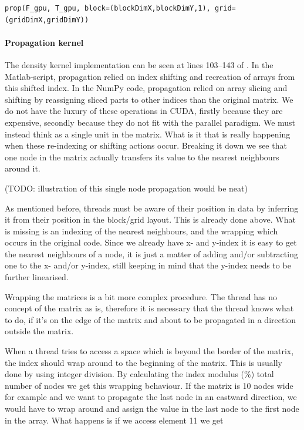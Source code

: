 \begin{verbatim}
prop(F_gpu, T_gpu, block=(blockDimX,blockDimY,1), grid=(gridDimX,gridDimY))
\end{verbatim}


\paragraph{Propagation kernel} The density kernel implementation can be seen at lines 103--143 of . In the Matlab-script, propagation relied on index shifting and recreation of arrays from this shifted index. In the NumPy code, propagation relied on array slicing and shifting by reassigning sliced parts to other indices than the original matrix. We do not have the luxury of these operations in CUDA, firstly because they are expensive, secondly because they do not fit with the parallel paradigm. We must instead think as a single unit in the matrix. What is it that is really happening when these re-indexing or shifting actions occur. Breaking it down we see that one node in the matrix actually transfers its value to the nearest neighbours around it.

(TODO: illustration of this single node propagation would be neat)

As mentioned before, threads must be aware of their position in data by inferring it from their position in the block/grid layout. This is already done above. What is missing is an indexing of the nearest neighbours, and the wrapping which occurs in the original code. Since we already have x- and y-index it is easy to get the nearest neighbours of a node, it is just a matter of adding and/or subtracting one to the x- and/or y-index, still keeping in mind that the y-index needs to be further linearised.

Wrapping the matrices is a bit more complex procedure. The thread has no concept of the matrix as is, therefore it is necessary that the thread knows what to do, if it's on the edge of the matrix and about to be propagated in a direction outside the matrix.

When a thread tries to access a space which is beyond the border of the matrix, the index should wrap around to the beginning of the matrix. This is usually done by using integer division. By calculating the index modulus (\%) total number of nodes we get this wrapping behaviour. If the matrix is 10 nodes wide for example and we want to propagate the last node in an eastward direction, we would have to wrap around and assign the value in the last node to the first node in the array. What happens is if we access element 11 we get

